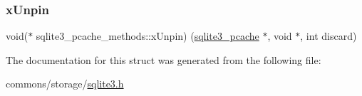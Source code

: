 \mbox{\label{structsqlite3__pcache__methods_a2aa1aefc301a0fe4998ed8397b028630}} 
\subsubsection{\texorpdfstring{xUnpin}{xUnpin}}
{\footnotesize\ttfamily void($\ast$ sqlite3\+\_\+pcache\+\_\+methods\+::x\+Unpin) (\mbox{\hyperlink{sqlite3_8h_a096c453d937d51f7926d7d31c8e0bd2f}{sqlite3\+\_\+pcache}} $\ast$, void $\ast$, int discard)}



The documentation for this struct was generated from the following file\+:\begin{DoxyCompactItemize}
\item 
commons/storage/\mbox{\hyperlink{sqlite3_8h}{sqlite3.\+h}}\end{DoxyCompactItemize}
